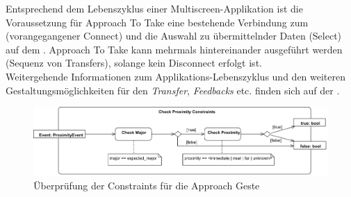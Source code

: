 {Entsprechend dem Lebenszyklus einer Multiscreen-Applikation ist die Voraussetzung
für Approach To Take eine bestehende Verbindung zum \sendev{} (vorangegangener Connect) und die Auswahl zu übermittelnder Daten (Select) auf dem \sendev{}. Approach To Take kann mehrmals hintereinander ausgeführt werden (Sequenz von Transfers), solange kein Disconnect erfolgt ist.\\

Weitergehende Informationen zum Applikations-Lebenszyklus und den weiteren
Gestaltungsmöglichkeiten für den \textit{Transfer}, \textit{Feedbacks} etc. finden sich
auf der \developerpage.

\begin{figure}[h]
\includegraphics[width=\textwidth]{approach_check_constraints.png}
\caption{Überprüfung der Constraints für die Approach Geste}
\label{check_approach_constraints}
\end{figure}
}


\newcommand{\authors}{Horst Schneider, Hochschule Mannheim\\
Dominick Madden, Hochschule Mannheim\\
Valentina Burjan, Hochschule Mannheim}
\newcommand{\versionhistory}{20.02.2017}
\newcommand{\dateofcreation}{15.08.2015}
\newcommand{\comments}{...}
\newcommand{\questions}{...}


